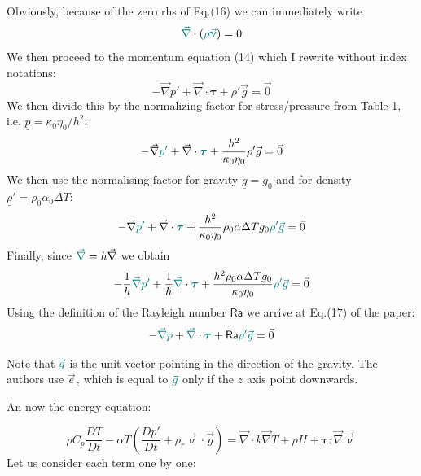 \documentclass[a4paper,11pt]{article}
\newcommand{\Ranb}{{\mathsf{Ra}}}
\begin{document}
Obviously, because of the zero rhs of Eq.(16) we can immediately write
\[
{\color{teal} \vec\nabla } \cdot  ({\color{teal} \rho \vec\upnu}) = 0
\]
We then proceed to the momentum equation (14) which I rewrite without index notations:
\[
-\vec\nabla p' + \vec\nabla \cdot {\bm \tau} + \rho' \vec{g} = \vec{0}
\]
We then divide this by the normalizing factor for stress/pressure from Table 1, i.e. 
$\underline{p}=\kappa_0 \eta_0/h^2$:
\[
-\vec\nabla {\color{teal}p'} + \vec\nabla \cdot {\color{teal} {\bm \tau}} 
+ \frac{h^2}{\kappa_0 \eta_0}\rho' \vec{g} = \vec{0}
\]
We then use the normalising factor for gravity $\underline{g}=g_0$ and 
for density $\underline{\rho}' =\rho_0 \alpha_0 \Delta T$:
\[
-\vec\nabla {\color{teal}p'} + \vec\nabla \cdot {\color{teal} {\bm \tau}} 
+ \frac{h^2}{\kappa_0 \eta_0} \rho_0 \alpha \Delta T g_0 {\color{teal} \rho' \vec{g}} = \vec{0}
\]
Finally, since ${\color{teal} \vec\nabla} = h \vec\nabla $
we obtain
\[
-\frac{1}{h} {\color{teal} \vec\nabla} {\color{teal}p'} 
+ \frac{1}{h} {\color{teal} \vec\nabla} \cdot {\color{teal} {\bm \tau}} 
+ \frac{h^2 \rho_0 \alpha \Delta T g_0 }{\kappa_0 \eta_0} {\color{teal} \rho' \vec{g}} = \vec{0}
\]
Using the definition of the Rayleigh number $\Ranb$ we arrive at Eq.(17) of the paper:
\[
-{\color{teal} \vec\nabla} {\color{teal}p} + {\color{teal} \vec\nabla} \cdot 
{\color{teal} {\bm \tau}}
+ \Ranb  {\color{teal} \rho' \vec{g}} =\vec{0} 
\]


Note that ${\color{teal} \vec{g}}$ is the unit vector pointing in the direction 
of the gravity. The authors use $\vec{e}_z$ which is equal to ${\color{teal} \vec{g}}$ 
only if the $z$ axis point downwards.

An now the energy equation:

\[
\rho C_p \frac{DT}{Dt} 
- \alpha T \left( \frac{Dp'}{Dt} + \rho_r \vec\upnu \cdot \vec{g} \right)
= \vec\nabla \cdot k \vec\nabla T
+ \rho H 
+ {\bm \tau} : \vec\nabla \vec\upnu
\]
Let us consider each term one by one:
\end{document}
